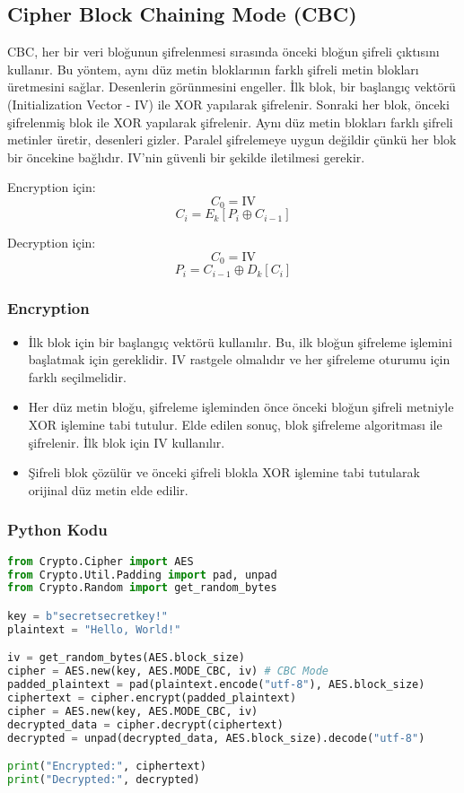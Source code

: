 \newpage

\subsection{Cipher Block Chaining Mode (CBC)}

CBC, her bir veri bloğunun şifrelenmesi sırasında önceki bloğun şifreli çıktısını kullanır. Bu yöntem, aynı düz metin bloklarının farklı şifreli metin blokları üretmesini sağlar. Desenlerin görünmesini engeller. İlk blok, bir başlangıç vektörü (Initialization Vector - IV) ile XOR yapılarak şifrelenir. Sonraki her blok, önceki şifrelenmiş blok ile XOR yapılarak şifrelenir. Aynı düz metin blokları farklı şifreli metinler üretir, desenleri gizler. Paralel şifrelemeye uygun değildir çünkü her blok bir öncekine bağlıdır. IV'nin güvenli bir şekilde iletilmesi gerekir.

Encryption için:
\[ C_0 = \text{IV} \]
\[ C_i = E_k [P_i \oplus C_{i-1}] \]

Decryption için:
\[ C_0 = \text{IV} \]
\[ P_i = C_{i-1} \oplus D_k [C_i] \]

\subsubsection{Encryption}

\begin{itemize}
    \item İlk blok için bir başlangıç vektörü kullanılır. Bu, ilk bloğun şifreleme işlemini başlatmak için gereklidir. IV rastgele olmalıdır ve her şifreleme oturumu için farklı seçilmelidir. 
    \item Her düz metin bloğu, şifreleme işleminden önce önceki bloğun şifreli metniyle XOR işlemine tabi tutulur. Elde edilen sonuç, blok şifreleme algoritması ile şifrelenir. İlk blok için IV kullanılır.
    \item Şifreli blok çözülür ve önceki şifreli blokla XOR işlemine tabi tutularak orijinal düz metin elde edilir.
\end{itemize}

\subsubsection{Python Kodu}

\begin{lstlisting}[language=Python]
from Crypto.Cipher import AES
from Crypto.Util.Padding import pad, unpad
from Crypto.Random import get_random_bytes

key = b"secretsecretkey!"
plaintext = "Hello, World!"

iv = get_random_bytes(AES.block_size)
cipher = AES.new(key, AES.MODE_CBC, iv) # CBC Mode
padded_plaintext = pad(plaintext.encode("utf-8"), AES.block_size)
ciphertext = cipher.encrypt(padded_plaintext)
cipher = AES.new(key, AES.MODE_CBC, iv)
decrypted_data = cipher.decrypt(ciphertext)
decrypted = unpad(decrypted_data, AES.block_size).decode("utf-8")

print("Encrypted:", ciphertext)
print("Decrypted:", decrypted)
\end{lstlisting}

